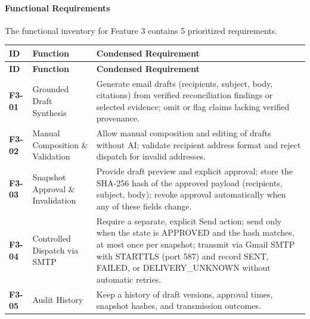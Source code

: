 \paragraph*{Functional Requirements}

The functional inventory for Feature 3 contains 5 prioritized requirements.



\begingroup

\small

\setlength{\tabcolsep}{5pt}

\renewcommand{\arraystretch}{1.15}

\begin{longtable}{>{\raggedright\arraybackslash}p{}>{\raggedright\arraybackslash}p{}>{\raggedright\arraybackslash}p{}}

\hline

\rowcolor{tablehead}

\textbf{ID} & \textbf{Function} & \textbf{Condensed Requirement} \\ \hline

\endfirsthead

\hline

\rowcolor{tablehead}

\textbf{ID} & \textbf{Function} & \textbf{Condensed Requirement} \\ \hline

\endhead

\endfoot

\endlastfoot

\textbf{F3-01} & Grounded Draft Synthesis & Generate email drafts (recipients, subject, body, citations) from verified reconciliation findings or selected evidence; omit or flag claims lacking verified provenance. \\ \hline

\textbf{F3-02} & Manual Composition \& Validation & Allow manual composition and editing of drafts without AI; validate recipient address format and reject dispatch for invalid addresses. \\ \hline

\textbf{F3-03} & Snapshot Approval \& Invalidation & Provide draft preview and explicit approval; store the SHA-256 hash of the approved payload (recipients, subject, body); revoke approval automatically when any of these fields change. \\ \hline

\textbf{F3-04} & Controlled Dispatch via SMTP & Require a separate, explicit Send action; send only when the state is APPROVED and the hash matches, at most once per snapshot; transmit via Gmail SMTP with STARTTLS (port 587) and record SENT, FAILED, or DELIVERY\_UNKNOWN without automatic retries. \\ \hline

\textbf{F3-05} & Audit History & Keep a history of draft versions, approval times, snapshot hashes, and transmission outcomes. \\ \hline

\end{longtable}

